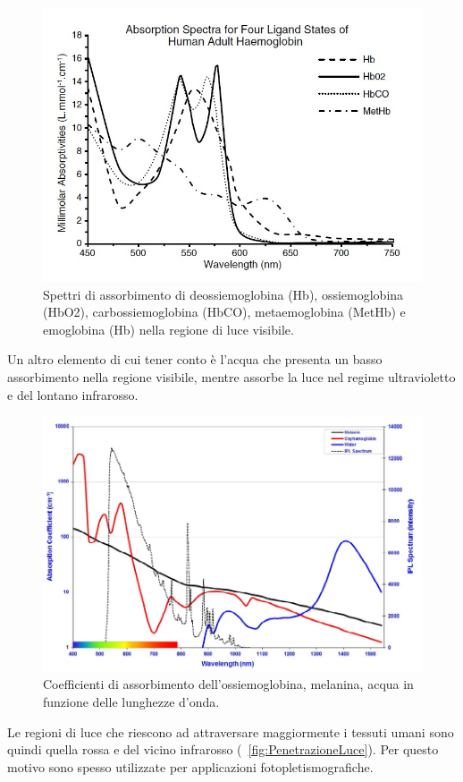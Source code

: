 \begin{figure}[h]
	\centering
	\includegraphics[width=0.8\linewidth]{ImageFiles/Fotopletismografia/AssorbimentoEmolglobina}
	\caption{Spettri di assorbimento di deossiemoglobina (Hb), ossiemoglobina (HbO2), carbossiemoglobina (HbCO), metaemoglobina (MetHb) e emoglobina (Hb) nella regione di luce visibile.}
	\label{fig:AssorbimentoEmolglobina}
\end{figure}
Un altro elemento di cui tener conto è l'acqua che presenta un basso assorbimento nella regione visibile, mentre assorbe la luce nel regime ultravioletto e del lontano infrarosso. 
\begin{figure}[h]
	\centering
	\includegraphics[width=1\linewidth]{ImageFiles/Fotopletismografia/PicchiAssorbimento}
	\caption{Coefficienti di assorbimento dell'ossiemoglobina, melanina, acqua in funzione delle lunghezze d'onda.}
	\label{fig:PicchiAssorbimento}
\end{figure}
Le regioni di luce che riescono ad attraversare maggiormente i tessuti umani sono quindi quella rossa e del vicino infrarosso (\Fig~\ref{fig:PenetrazioneLuce}). Per questo motivo sono spesso utilizzate per applicazioni fotopletismografiche.
